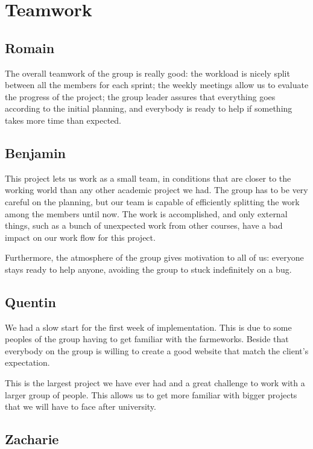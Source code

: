 \section{Teamwork}

\subsection{Romain}
The overall teamwork of the group is really good: the workload is nicely
split between all the members for each sprint; the weekly meetings allow
us to evaluate the progress of the project; the group leader assures that
everything goes according to the initial planning, and everybody is ready to
help if something takes more time than expected. \newline

\subsection{Benjamin}

This project lets us work as a small team, in conditions that are closer to the working world than any other academic project we had. The group has to be very careful on the planning, but our team is capable of efficiently splitting the work among the members until now. The work is accomplished, and only external things, such as a bunch of unexpected work from other courses, have a bad impact on our work flow for this project. \newline

Furthermore, the atmosphere of the group gives motivation to all of us: everyone stays ready to help anyone, avoiding the group to stuck indefinitely on a bug.

\subsection{Quentin}
We had a slow start for the first week of implementation. This is due to some peoples of the group having to get familiar with the farmeworks. Beside that everybody on the group is willing to create a good website that match the client's expectation.\newline

This is the largest project we have ever had and a great challenge to work with a larger group of people. This allows us to get more familiar with bigger projects that we will have to face after university. 


\subsection{Zacharie}


